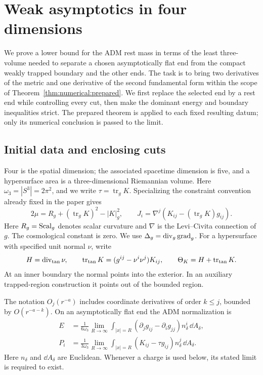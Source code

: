\section{Weak asymptotics in four dimensions}
\label{n4:sec:introduction}\label{sec:weak4}

We prove a lower bound for the ADM rest mass in terms of the least
three-volume needed to separate a chosen asymptotically flat end from
the compact weakly trapped boundary and the other ends. The task is to
bring two derivatives of the metric and one derivative
of the second fundamental form within the scope of
Theorem~\ref{thm:numerical:prepared}. We first replace the selected end
by a rest end while controlling every cut, then make the dominant
energy and boundary inequalities strict. The prepared theorem is
applied to each fixed resulting datum; only its numerical conclusion
is passed to the limit.

\subsection{Initial data and enclosing cuts}

Four is the spatial dimension; the associated spacetime dimension is
five, and a hypersurface area is a three-dimensional Riemannian volume.
Here $\omega_3=|S^3|=2\pi^2$, and we write
$\tau=\operatorname{tr}_gK$. Specializing the constraint convention
already fixed in the paper gives
\[
 2\mu=R_g+(\operatorname{tr}_gK)^2-|K|_g^2,\qquad
 J_i=\nabla^j(K_{ij}-(\operatorname{tr}_gK)g_{ij}).
\]
Here $R_g=\operatorname{Scal}_g$ denotes scalar curvature and $\nabla$ is the
Levi--Civita connection of $g$. The cosmological constant is zero. We use
\(\Delta_g=\operatorname{div}_g\operatorname{grad}_g\).
For a hypersurface with specified unit normal \(\nu\), write
\[
 H=\operatorname{div}_{\mathrm{tan}}\nu,\qquad
 \operatorname{tr}_{\mathrm{tan}}K=(g^{ij}-\nu^i\nu^j)K_{ij},\qquad
 \Theta_K=H+\operatorname{tr}_{\mathrm{tan}}K.
\]
At an inner boundary the normal points into the exterior. In an auxiliary
trapped-region construction it points out of the bounded region.

The notation \(O_j(r^{-a})\) includes coordinate derivatives of order
\(k\le j\), bounded by \(O(r^{-a-k})\). On an asymptotically flat end the
ADM normalization is
\begin{align}
 E&=\frac{1}{6\omega_3}\lim_{R\to\infty}
       \int_{|x|=R}(\partial_jg_{ij}-\partial_i g_{jj})
                    n_\delta^i\,\dd A_\delta,\label{n4:intro:energy}\\
 P_i&=\frac{1}{3\omega_3}\lim_{R\to\infty}
       \int_{|x|=R}(K_{ij}-\tau g_{ij})
                    n_\delta^j\,\dd A_\delta.\label{n4:intro:momentum}
\end{align}
Here \(n_\delta\) and \(\dd A_\delta\) are Euclidean.
Whenever a charge is used below, its stated limit is required to exist.

